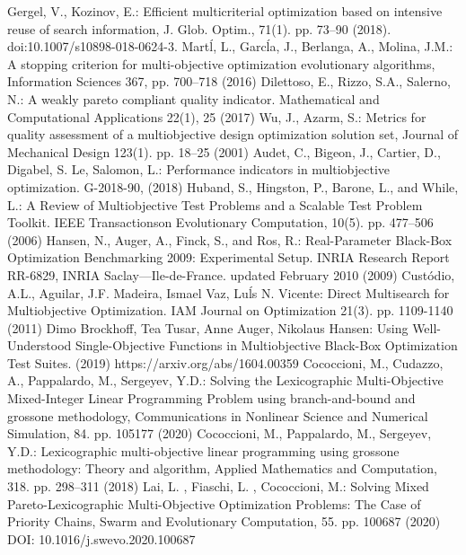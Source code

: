\documentclass[smallextended]{svjour3}       %
\begin{document}
\begin{thebibliography}{}
 Gergel, V., Kozinov, E.: Efficient multicriterial optimization based on intensive reuse of search information, J. Glob. Optim., 71(1). pp. 73--90 (2018). doi:10.1007/s10898-018-0624-3.
 Mart\'l, L., Garc\'la, J., Berlanga, A., Molina, J.M.: A stopping criterion for multi-objective optimization evolutionary algorithms, Information Sciences 367, pp. 700--718 (2016)
 Dilettoso, E., Rizzo, S.A., Salerno, N.: A weakly pareto compliant quality indicator. Mathematical and Computational Applications 22(1), 25 (2017)
 Wu, J., Azarm, S.: Metrics for quality assessment of a multiobjective design optimization solution set, Journal of Mechanical Design 123(1). pp. 18--25 (2001)
 Audet, C., Bigeon, J., Cartier, D., Digabel,  S. Le, Salomon, L.: Performance indicators in multiobjective optimization. G-2018-90, (2018)
 Huband, S., Hingston, P., Barone, L., and While, L.: A Review of Multiobjective Test Problems and a Scalable Test Problem Toolkit. IEEE Transactionson Evolutionary Computation, 10(5). pp. 477--506 (2006)
 Hansen, N., Auger, A., Finck, S., and Ros, R.: Real-Parameter Black-Box Optimization Benchmarking 2009: Experimental Setup. INRIA Research Report RR-6829, INRIA Saclay—Ile-de-France. updated February 2010 (2009)
 Cust\'odio, A.L., Aguilar, J.F. Madeira, Ismael Vaz, Lu\'ls N. Vicente: Direct Multisearch for Multiobjective Optimization. IAM Journal on Optimization 21(3). pp. 1109-1140 (2011)
 Dimo Brockhoff, Tea Tusar, Anne Auger, Nikolaus Hansen: Using Well-Understood Single-Objective Functions in Multiobjective Black-Box Optimization Test Suites. (2019) https://arxiv.org/abs/1604.00359 
 Cococcioni, M., Cudazzo, A., Pappalardo, M., Sergeyev, Y.D.: Solving the Lexicographic Multi-Objective Mixed-Integer Linear Programming Problem using branch-and-bound and grossone methodology, Communications in Nonlinear Science and Numerical Simulation, 84. pp. 105177 (2020)
 Cococcioni, M., Pappalardo, M., Sergeyev, Y.D.: Lexicographic multi-objective linear programming using grossone methodology: Theory and algorithm, Applied Mathematics and Computation, 318. pp. 298--311 (2018)
 Lai, L. , Fiaschi, L. , Cococcioni, M.: Solving Mixed Pareto-Lexicographic Multi-Objective Optimization Problems: The Case of Priority Chains, Swarm and Evolutionary Computation, 55. pp. 100687 (2020) DOI: 10.1016/j.swevo.2020.100687


\end{thebibliography}
\end{document}
